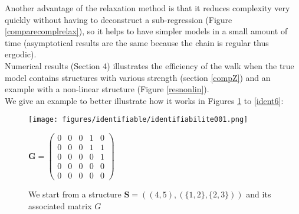 \documentclass[12pt,a4paper]{report}
\begin{document}
	Another advantage of the relaxation method is that it reduces complexity very quickly without having to deconstruct a sub-regression (Figure \ref{comparecomplrelax}), so it helps to have simpler models in a small amount of time (asymptotical results are the same because the chain is regular thus ergodic).\\
			
Numerical results (Section 4) illustrates the efficiency of the walk when the true model contains structures with various strength (section \ref{compZ}) and an example with a non-linear structure (Figure \ref{resnonlin}). \\

We give an example to better illustrate how it works in Figures \ref{ident1} to \ref{ident6}:
\begin{figure}
	\begin{minipage}[l]{.45\linewidth}
\texttt{[image: figures/identifiable/identifiabilite001.png]} 
	\end{minipage}
	\begin{minipage}[c]{.45\linewidth}
		$\boldsymbol{G}=\left( \begin{array}{ccccc}
		0 & 0 & 0 & 1 & 0 \\ 
		0 & 0 & 0 & 1 & 1 \\ 
		0 & 0 & 0 & 0 & 1 \\ 
		0 & 0 & 0 & 0 & 0 \\ 
		0 & 0 & 0 & 0 & 0
		\end{array} \right)$
	\end{minipage}
	\caption{We start from a structure $\boldsymbol{S}=((4,5),(\{1,2\},\{2,3\}))$ and its associated matrix $G$}\label{ident1}
\end{figure}
		
\end{document}
